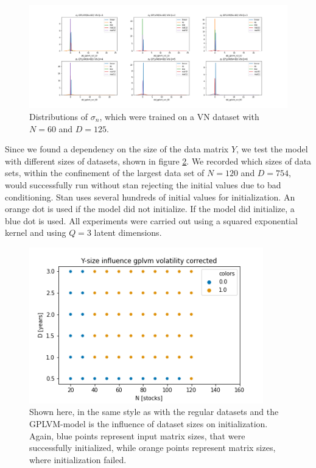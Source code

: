 \begin{figure}[h!]%
	\centering
	\includegraphics[width=7in]{img/07_0/std_GPLVM_vcr_60.png}
	\caption[Variance Distributions of GPLVM with VN dataset]{Distributions of $\sigma_{n}$, which were trained on a VN dataset with $N=60$ and $D=125$.}
	\label{fig:variance_vcr}
\end{figure}
Since we found a dependency on the size of the data matrix $Y$, we test the model with different sizes of datasets, shown in figure \ref{fig:dataset_size_init}. We recorded which sizes of data sets, within the confinement of the largest data set of $N=120$ and $D=754$, would successfully run without stan rejecting the initial values due to bad conditioning. Stan uses several hundreds of initial values for initialization. An orange dot is used if the model did not initialize. If the model did initialize, a blue dot is used. All experiments were carried out using a squared exponential kernel and using $Q=3$ latent dimensions.
\begin{figure}[h!]%
	\centering
	\includegraphics[width=4in]{img/07_0/size_influence-gplvm_vcr.png}
	\caption[Initialization of GPLVM model VN datasets]
	{Shown here, in the same style as with the regular datasets and the GPLVM-model is the influence of dataset sizes on initialization. Again, blue points represent input matrix sizes, that were successfully initialized, while orange points represent matrix sizes, where initialization failed.}
	\label{fig:dataset_size_init}
\end{figure}
